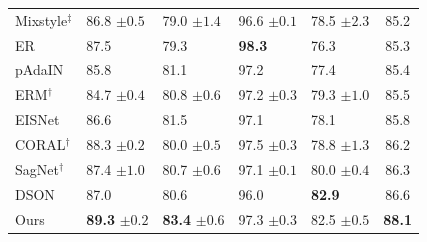\begin{table}[H]
\begin{tabular}{lllll|c}
Mixstyle$^\ddagger$ & 86.8 \scriptsize$\pm0.5$ & 79.0 \scriptsize$\pm1.4$ & 96.6 \scriptsize$\pm0.1$ & 78.5 \scriptsize$\pm2.3$ & 85.2 \\
ER & 87.5 & 79.3 & \textbf{98.3} & 76.3 & 85.3 \\
pAdaIN & 85.8 & 81.1 & 97.2 & 77.4 & 85.4 \\
ERM$^\dagger$ & 84.7 \scriptsize$\pm0.4$ & 80.8 \scriptsize$\pm0.6$ & 97.2 \scriptsize$\pm0.3$ & 79.3 \scriptsize$\pm1.0$ & 85.5 \\
EISNet & 86.6 & 81.5 & 97.1 & 78.1 & 85.8 \\
CORAL$^\dagger$ & 88.3 \scriptsize$\pm0.2$ & 80.0 \scriptsize$\pm0.5$ & 97.5 \scriptsize$\pm0.3$ & 78.8 \scriptsize$\pm1.3$ & 86.2 \\
SagNet$^\dagger$ & 87.4 \scriptsize$\pm1.0$ & 80.7 \scriptsize$\pm0.6$ & 97.1 \scriptsize$\pm0.1$ & 80.0 \scriptsize$\pm0.4$ & 86.3 \\
DSON & 87.0 & 80.6 & 96.0 & \textbf{82.9} & 86.6 \\
\midrule
Ours & \textbf{89.3} \scriptsize$\pm0.2$ & \textbf{83.4} \scriptsize$\pm0.6$ & 97.3 \scriptsize$\pm0.3$ & 82.5 \scriptsize$\pm0.5$ & \textbf{88.1} \\
\bottomrule
\end{tabular}
\end{table}
